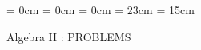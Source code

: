 

\topmargin = 0cm
\oddsidemargin = 0cm \evensidemargin = 0cm
\textheight = 23cm \textwidth = 15cm %

\newcommand{\bZ}{\mbox{\boldmath $Z$}}
\newcommand{\bQ}{\mbox{\boldmath $Q$}}
\newcommand{\bR}{\mbox{\boldmath $R$}}
\newcommand{\bC}{\mbox{\boldmath $C$}}
\newcommand{\bN}{\mbox{\boldmath $N$}}

\def\labelenumi{\thesection.\theenumi}

\begin{center}
{\LARGE\gt Algebra II :  PROBLEMS}
\end{center}


